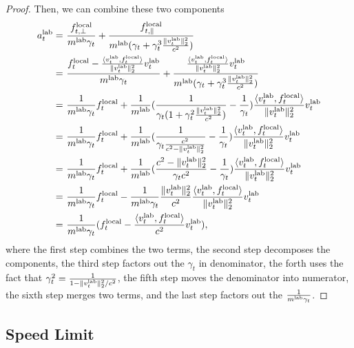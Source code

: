 \begin{proof}
Then, we can combine these two components
\begin{align*}
    a_t^{\rm lab} = & ~\frac{f_{t, \perp}^{\rm local}}{m^{\rm lab}\gamma_t} + \frac{f_{t, \parallel}^{\rm local}}{m^{\rm lab}(\gamma_t + \gamma_t^3 \frac{\|v_t^{\rm lab}\|_2^2}{c^2})} \\
    = & ~\frac{f_t^{\rm local} - \frac{\langle v_t^{\rm lab}, f_t^{\rm local} \rangle}{\|v_t^{\rm lab}\|_2^2} v_t^{\rm lab}}{m^{\rm lab}\gamma_t} + \frac{\frac{ \langle v_t^{\rm lab}, f_t^{\rm local} \rangle}{\|v_t^{\rm lab}\|_2^2} v_t^{\rm lab}}{m^{\rm lab}(\gamma_t + \gamma_t^3 \frac{\|v_t^{\rm lab}\|_2^2}{c^2})} \\
    = & ~\frac{1}{m^{\rm lab}\gamma_t} f_t^{\rm local} + \frac{1}{m^{\rm lab}} ( \frac{1}{\gamma_t(1 + \gamma_t^2 \frac{\|v_t^{\rm lab}\|_2^2}{c^2})} - \frac{1}{\gamma_t} ) \frac{ \langle v_t^{\rm lab}, f_t^{\rm local} \rangle}{\|v_t^{\rm lab}\|_2^2} v_t^{\rm lab} \\
    = & ~\frac{1}{m^{\rm lab}\gamma_t} f_t^{\rm local} + \frac{1}{m^{\rm lab}} ( \frac{1}{\gamma_t \frac{c^2}{c^2 - \|v_t^{\rm lab}\|_2^2} } - \frac{1}{\gamma_t} ) \frac{ \langle v_t^{\rm lab}, f_t^{\rm local} \rangle}{\|v_t^{\rm lab}\|_2^2} v_t^{\rm lab} \\
    = & ~\frac{1}{m^{\rm lab}\gamma_t} f_t^{\rm local} + \frac{1}{m^{\rm lab}} ( \frac{c^2 - \|v_t^{\rm lab}\|_2^2}{\gamma_t c^2} - \frac{1}{\gamma_t} ) \frac{ \langle v_t^{\rm lab}, f_t^{\rm local} \rangle}{\|v_t^{\rm lab}\|_2^2} v_t^{\rm lab} \\
    = & ~\frac{1}{m^{\rm lab}\gamma_t} f_t^{\rm local} - \frac{1}{m^{\rm lab} \gamma_t} \frac{\|v_t^{\rm lab}\|_2^2}{c^2} \frac{ \langle v_t^{\rm lab}, f_t^{\rm local} \rangle}{\|v_t^{\rm lab}\|_2^2} v_t^{\rm lab} \\
    = & ~ \frac{1}{m^{\rm lab} \gamma_t}(f_t^{\rm local} - \frac{\langle v_t^{\rm lab}, f_t^{\rm local} \rangle}{c^2} v_t^{\rm lab}),
\end{align*}
where the first step combines the two terms, the second step decomposes the components, the third step factors out the $\gamma_t$ in denominator, the forth uses the fact that $\gamma_t^2 = \frac{1}{1 - \|v_t^{\rm lab}\|_2^2/c^2}$, the fifth step moves the denominator into numerator, the sixth step merges two terms, and the last step factors out the $\frac{1}{m^{\rm lab} \gamma_t}$.
\end{proof}

\subsection{Speed Limit} \label{sub:app:speed_limit}

